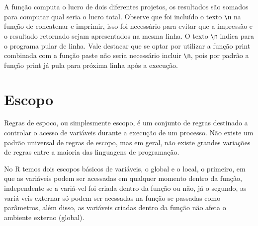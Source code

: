 \documentclass[
  11pt,
  a5paper,
  openany]{book}
\newenvironment{Shaded}{\begin{snugshade}}{\end{snugshade}}
\newcommand{\CharTok}[1]{\textcolor[rgb]{0.31,0.60,0.02}{#1}}
\newcommand{\CommentTok}[1]{\textcolor[rgb]{0.56,0.35,0.01}{\textit{#1}}}
\newcommand{\ControlFlowTok}[1]{\textcolor[rgb]{0.13,0.29,0.53}{\textbf{#1}}}
\newcommand{\DecValTok}[1]{\textcolor[rgb]{0.00,0.00,0.81}{#1}}
\newcommand{\KeywordTok}[1]{\textcolor[rgb]{0.13,0.29,0.53}{\textbf{#1}}}
\newcommand{\NormalTok}[1]{#1}
\newcommand{\OperatorTok}[1]{\textcolor[rgb]{0.81,0.36,0.00}{\textbf{#1}}}
\newcommand{\StringTok}[1]{\textcolor[rgb]{0.31,0.60,0.02}{#1}}
\begin{document}
\begin{Shaded}
\end{Shaded}

A função computa o lucro de dois diferentes projetos, os resultados são somados para computar qual seria o lucro total. Observe que foi incluído o texto \texttt{\textbackslash{}n} na função de concatenar e imprimir, isso foi necessário para evitar que a impressão e o resultado retornado sejam apresentados na mesma linha. O texto \texttt{\textbackslash{}n} indica para o programa pular de linha. Vale destacar que se optar por utilizar a função print combinada com a função paste não seria necessário incluir \texttt{\textbackslash{}n}, pois por padrão a função print já pula para próxima linha após a execução.

\hypertarget{escopo}{%
\section{Escopo}\label{escopo}}

Regras de espoco, ou simplesmente escopo, é um conjunto de regras destinado a controlar o acesso de variáveis durante a execução de um processo. Não existe um padrão universal de regras de escopo, mas em geral, não existe grandes variações de regras entre a maioria das linguagens de programação.

No R temos dois escopos básicos de variáveis, o global e o local, o primeiro, em que as variáveis podem ser acessadas em qualquer momento dentro da função, independente se a variá-vel foi criada dentro da função ou não, já o segundo, as variá-veis externar só podem ser acessadas na função se passadas como parâmetros, além disso, as variáveis criadas dentro da função não afeta o ambiente externo (global).

  
\end{document}
